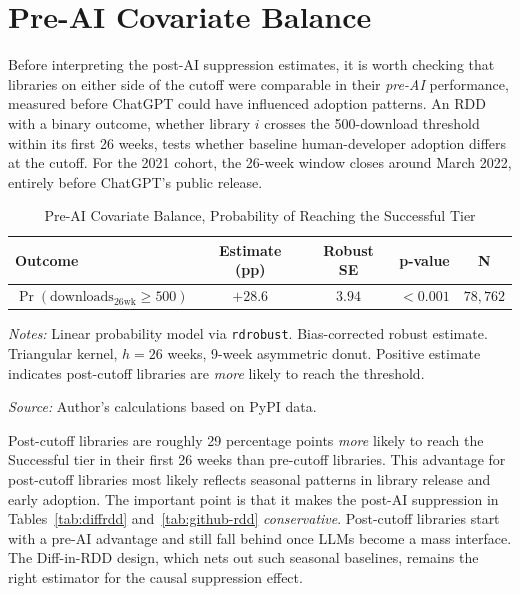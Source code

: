 \documentclass[12pt, a4paper]{report}
\begin{document}
\section{Pre-AI Covariate Balance}\label{sec:results-barrier}
Before interpreting the post-AI suppression estimates, it is worth checking that libraries on either side of the cutoff were comparable in their \textit{pre-AI} performance, measured before ChatGPT could have influenced adoption patterns. An RDD with a binary outcome, whether library $i$ crosses the 500-download threshold within its first 26 weeks, tests whether baseline human-developer adoption differs at the cutoff. For the 2021 cohort, the 26-week window closes around March 2022, entirely before ChatGPT's public release.

\begin{table}[ht]
\centering
\caption{Pre-AI Covariate Balance, Probability of Reaching the Successful Tier}\label{tab:barrier}
\small
\begin{tabular}{lcccc}
\toprule
\textbf{Outcome} & \textbf{Estimate (pp)} & \textbf{Robust SE} & \textbf{p-value} & \textbf{N} \\ \midrule
$\Pr(\text{downloads}_{26\text{wk}} \geq 500)$ & $+28.6$ & $3.94$ & $<0.001$ & $78{,}762$ \\ \bottomrule
\end{tabular}
\begin{tablenotes}
\small
\item \textit{Notes:} Linear probability model via \texttt{rdrobust}. Bias-corrected robust estimate. Triangular kernel, $h = 26$ weeks, 9-week asymmetric donut. Positive estimate indicates post-cutoff libraries are \textit{more} likely to reach the threshold.
\item \textit{Source:} Author's calculations based on PyPI data.
\end{tablenotes}
\end{table}

Post-cutoff libraries are roughly 29 percentage points \textit{more} likely to reach the Successful tier in their first 26 weeks than pre-cutoff libraries. This advantage for post-cutoff libraries most likely reflects seasonal patterns in library release and early adoption. The important point is that it makes the post-AI suppression in Tables~\ref{tab:diffrdd} and~\ref{tab:github-rdd} \textit{conservative}. Post-cutoff libraries start with a pre-AI advantage and still fall behind once LLMs become a mass interface. The Diff-in-RDD design, which nets out such seasonal baselines, remains the right estimator for the causal suppression effect.
\end{document}

